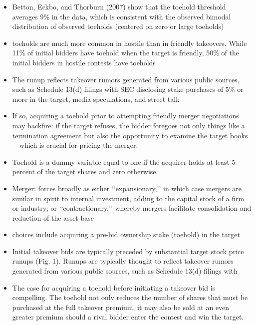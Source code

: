 \documentclass[12pt]{article}
\begin{document}
\begin{itemize}
        \item Betton, Eckbo, and Thorburn (2007) show that the toehold threshold averages 9\% in the data, which is consistent with the observed bimodal distribution of observed toeholds (centered on zero or large toeholds) \citep{Mitchell2011}

        \item toeholds are much more common in hostile than in friendly takeovers. While 11\% of initial bidders have toehold when the target is friendly, 50\% of the initial bidders in hostile contests have toeholds \citep{Mitchell2011}

        \item The runup reflects takeover rumors generated from various public sources, such as Schedule 13(d) filings with SEC disclosing stake purchases of 5\% or more in the target, media speculations, and street talk \citep{Mitchell2011}

        \item If so, acquiring a toehold prior to attempting friendly merger negotiations may backfire: if the target refuses, the bidder foregoes not only things like a termination agreement but also the opportunity to examine the target books—which is crucial for pricing the merger. \citep{Mitchell2011}

        \item Toehold is a dummy variable equal to one if the acquirer holds at least 5 percent of the target shares and zero otherwise. \citep{Moeller2004}

        \item Merger: forces broadly as either ‘‘expansionary,’’ in which case mergers are similar in spirit to internal investment, adding to the capital stock of a firm or industry; or ‘‘contractionary,’’ whereby mergers facilitate consolidation and reduction of the asset base \citep{Andrade2004}

        \item choices include acquiring a pre-bid ownership stake (toehold) in the target \citep{Eckbo2009}

        \item Initial takeover bids are typically preceded by substantial target stock price runups (Fig. 1). Runups are typically thought to reflect takeover rumors generated from various public sources, such as Schedule 13(d) filings with \citep{Eckbo2009}

        \item The case for acquiring a toehold before initiating a takeover bid is compelling. The toehold not only reduces the number of shares that must be purchased at the full takeover premium, it may also be sold at an even greater premium should a rival bidder enter the contest and win the target. \citep{Eckbo2009}


\end{itemize}
\end{document}

